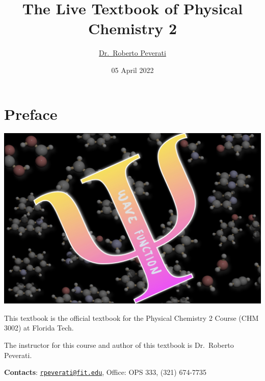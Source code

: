 \documentclass[
  9pt,
]{extbook}
\title{The Live Textbook of Physical Chemistry 2}
\author{\href{mailto:rpeverati@fit.edu}{Dr.~Roberto Peverati}}
\date{05 April 2022}
\let\oldmaketitle\maketitle
\theoremstyle{definition}
\theoremstyle{definition}
\theoremstyle{definition}
\theoremstyle{remark}
\begin{document}
\maketitle


%
\newpage

\let\maketitle\oldmaketitle

\renewcommand\thepage{\romannumeral\numexpr\value{page}-1\relax}


{
\setcounter{tocdepth}{1}
\tableofcontents
}
\renewcommand{\arraystretch}{1.8}

\hypertarget{preface}{%
\chapter*{Preface}\label{preface}}

\begin{center}\includegraphics[width=0.8\linewidth]{./img/OEP_Figures.000} \end{center}

This textbook is the official textbook for the Physical Chemistry 2 Course (CHM 3002) at Florida Tech.

The instructor for this course and author of this textbook is Dr.~Roberto Peverati.

\textbf{Contacts}: \href{mailto:rpeverati@fit.edu}{\nolinkurl{rpeverati@fit.edu}}, Office: OPS 333, (321) 674-7735
\end{document}
